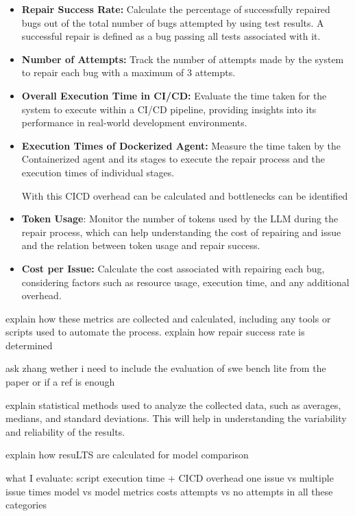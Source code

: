 \begin{itemize}
    \item\textbf{Repair Success Rate:} Calculate the percentage of successfully repaired bugs out of the total number of bugs attempted by using test results.
A successful repair is defined as a bug passing all tests associated with it.


\item\textbf{Number of Attempts:} Track the number of attempts made by the system to repair each bug with a maximum of 3 attempts.


\item\textbf{Overall Execution Time in CI/CD:} Evaluate the time taken for the system to execute within a CI/CD pipeline, providing insights into its performance in real-world development environments.


\item\textbf{Execution Times of Dockerized Agent:} Measure the time taken by the Containerized agent and its stages to execute the repair process and the  execution times of individual stages.

With this CICD overhead can be calculated and bottlenecks can be identified


\item\textbf{Token Usage}: Monitor the number of tokens used by the LLM during the repair process, which can help understanding the cost of repairing and issue and the relation between token usage and repair success.


\item\textbf{Cost per Issue:} Calculate the cost associated with repairing each bug, considering factors such as resource usage, execution time, and any additional overhead.
\end{itemize}

explain how these metrics are collected and calculated, including any tools or scripts used to automate the process.
explain how repair success rate is determined

ask zhang wether i need to include the evaluation of swe bench lite from the paper or if a ref is enough

explain statistical methods used to analyze the collected data, such as averages, medians, and standard deviations. This will help in understanding the variability and reliability of the results.

explain how resuLTS are calculated for model comparison

what I evaluate:
script execution time + CICD overhead
one issue vs multiple issue times
model vs model metrics
costs
attempts vs no attempts in all these categories